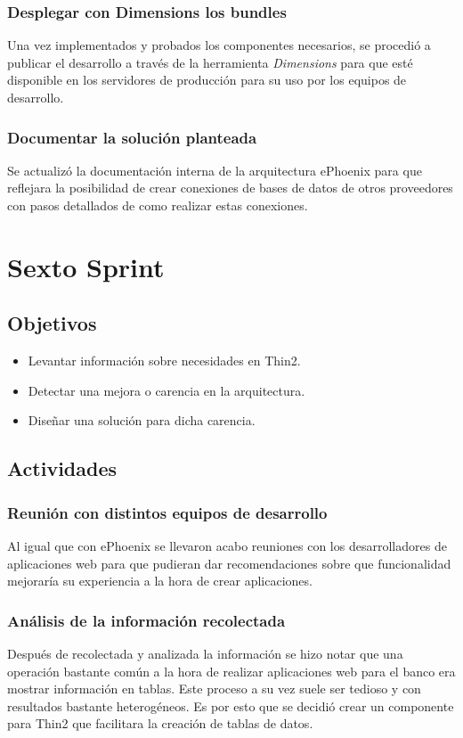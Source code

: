 \subsubsection{Desplegar con Dimensions los bundles}
Una vez implementados y probados los componentes necesarios, se procedió a publicar
el desarrollo a través de la herramienta \emph{Dimensions} para que esté disponible
en los servidores de producción para su uso por los equipos de desarrollo.
\subsubsection{Documentar la solución planteada}
Se actualizó la documentación interna de la arquitectura ePhoenix para que reflejara
la posibilidad de crear conexiones de bases de datos de otros proveedores con pasos
detallados de como realizar estas conexiones.

\section{Sexto Sprint}

\subsection{Objetivos}
\begin{itemize}
  \item Levantar información sobre necesidades en Thin2.
  \item Detectar una mejora o carencia en la arquitectura.
  \item Diseñar una solución para dicha carencia.
\end{itemize}
\subsection{Actividades}
\subsubsection{Reunión con distintos equipos de desarrollo}
Al igual que con ePhoenix se llevaron acabo reuniones con los desarrolladores
de aplicaciones web para que pudieran dar recomendaciones sobre que funcionalidad
mejoraría su experiencia a la hora de crear aplicaciones.
\subsubsection{Análisis de la información recolectada}
Después de recolectada y analizada la información se hizo notar que una operación
bastante común a la hora de realizar aplicaciones web para el banco era mostrar
información en tablas. Este proceso a su vez suele ser tedioso y con resultados
bastante heterogéneos. Es por esto que se decidió crear un componente para Thin2
que facilitara la creación de tablas de datos.
